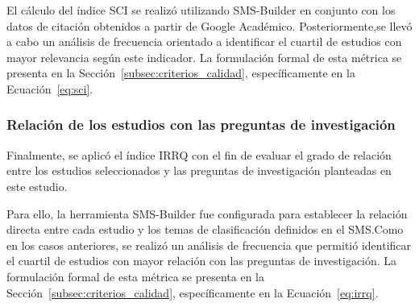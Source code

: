 El cálculo del índice SCI se realizó utilizando SMS-Builder en conjunto con los datos de citación obtenidos a partir de
Google Académico. Posteriormente,se llevó a cabo un análisis de frecuencia orientado a identificar el cuartil de estudios con 
mayor relevancia según este indicador. La formulación formal de esta métrica se presenta en la Sección~\ref{subsec:criterios_calidad}, 
específicamente en la Ecuación~\ref{eq:sci}.

\subsubsection{Relación de los estudios con las preguntas de investigación}

Finalmente, se aplicó el índice IRRQ con el fin de evaluar el grado de relación entre los estudios seleccionados y las preguntas de
investigación planteadas en este estudio.

Para ello, la herramienta SMS-Builder fue configurada para establecer la relación directa entre cada estudio y los temas de clasificación
definidos en el SMS.\@ Como en los casos anteriores, se realizó un análisis de frecuencia que permitió identificar el cuartil de
estudios con mayor relación con las preguntas de investigación. La formulación formal de esta métrica se presenta en la Sección~\ref{subsec:criterios_calidad}, 
específicamente en la Ecuación~\ref{eq:irrq}.